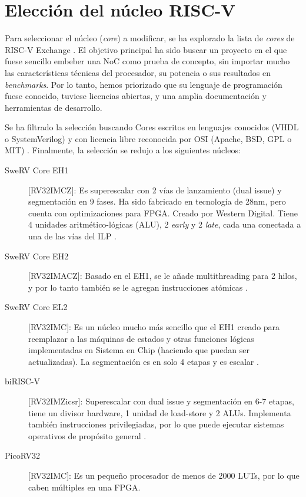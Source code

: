 \section{Elección del núcleo RISC-V}
\label{sec:desCore}

Para seleccionar el núcleo (\textit{core}) a modificar, se ha explorado la lista de \textit{cores} de RISC-V Exchange \cite{RiscVExchangeCores}. El objetivo principal ha sido buscar un proyecto en el que fuese sencillo embeber una NoC como prueba de concepto, sin importar mucho las características técnicas del procesador, su potencia o sus resultados en \textit{benchmarks}. Por lo tanto, hemos priorizado que su lenguaje de programación fuese conocido, tuviese licencias abiertas, y una amplia documentación y herramientas de desarrollo.

Se ha filtrado la selección buscando Cores escritos en lenguajes conocidos (VHDL o SystemVerilog) y con licencia libre reconocida por OSI (Apache, BSD, GPL o MIT) \cite{OSILicenses}. Finalmente, la selección se redujo a los siguientes núcleos:

\begin{description}
    \item[SweRV Core EH1] [RV32IMCZ]: Es superescalar con 2 vías de lanzamiento (dual issue) y segmentación en 9 fases. Ha sido fabricado en tecnología de 28nm, pero cuenta con optimizaciones para FPGA. Creado por Western Digital. Tiene 4 unidades aritmético-lógicas (ALU), 2 \textit{early} y 2 \textit{late}, cada una conectada a una de las vías del ILP \cite{RepoSwervEH1}.
    \item[SweRV Core EH2] [RV32IMACZ]: Basado en el EH1, se le añade multithreading para 2 hilos, y por lo tanto también se le agregan instrucciones atómicas \cite{RepoSwervEH2}.
    \item [SweRV Core EL2] [RV32IMC]: Es un núcleo mucho más sencillo que el EH1 creado para reemplazar a las máquinas de estados y otras funciones lógicas implementadas en Sistema en Chip (haciendo que puedan ser actualizadas). La segmentación es en solo 4 etapas y es escalar \cite{RepoSwervEL2}.
    \item [biRISC-V] [RV32IMZicsr]: Superescalar con dual issue y segmentación en 6-7 etapas, tiene un divisor hardware, 1 unidad de load-store y 2 ALUs. Implementa también instrucciones privilegiadas, por lo que puede ejecutar sistemas operativos de propósito general \cite{RepoBiRISCV}.
    \item [PicoRV32] [RV32IMC]: Es un pequeño procesador de menos de 2000 LUTs, por lo que caben múltiples en una FPGA. %
\end{description}

